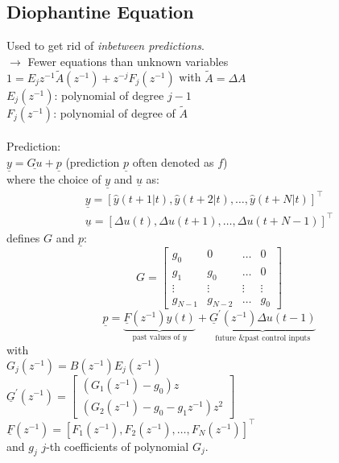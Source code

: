 \documentclass[english]{latex4ei/latex4ei_sheet}
\begin{document}
\begin{sectionbox}
\subsection{Diophantine Equation}
Used to get rid of \textit{inbetween predictions}.\\
$\rightarrow$ Fewer equations than unknown variables\\
$1=E_{j} z^{-1} \tilde{A}\left(z^{-1}\right)+z^{-j} F_{j}\left(z^{-1}\right)$ with $\tilde{A}=\Delta A$ \\ $E_{j}\left(z^{-1}\right)$: polynomial of degree $j-1$ \\ $F_{j}\left(z^{-1}\right)$: polynomial of degree of $\tilde{A}$
\\ \\

Prediction:\\ $\underline{y}=\underline{G u}+\underline{p}$ \quad(prediction $\underline{p}$ often denoted as $f$)\\
where the choice of $\underline{y}$ and $\underline{u}$ as:
$$
\begin{array}{l}{\underline{y}=[\hat{y}(t+1 | t), \hat{y}(t+2 | t), \ldots, \hat{y}(t+N | t)]^{\top}} \\ 
\underline{u}=[\Delta u(t), \Delta u(t+1), \ldots, \Delta u(t+N-1)]^{\top}
\end{array}
$$
defines $G$ and $\underline{p}$:
$$G=\left[\begin{array}{cccc}{g_{0}} & {0} & {\dots} & {0} \\ {g_{1}} & {g_{0}} & {\dots} & {0} \\ {\vdots} & {\vdots} & {\vdots} & {\vdots} \\ {g_{N-1}} & {g_{N-2}} & {\dots} & {g_{0}}\end{array}\right]$$
$$\underline{p}=\underbrace{\underline{F}\left(z^{-1}\right) y(t)}_{\text{past values of } y}+\underbrace{\underline{G}^{\prime}\left(z^{-1}\right) \Delta u(t-1)}_{\text{future \& past control inputs}}$$
with\\
$G_{j}\left(z^{-1}\right)=B\left(z^{-1}\right) E_{j}\left(z^{-1}\right)$\\
$\underline{G}^{\prime}\left(z^{-1}\right)=\left[\begin{array}{c}{\left(G_{1}\left(z^{-1}\right)-g_{0}\right) z} \\ {\left(G_{2}\left(z^{-1}\right)-g_{0}-g_{1} z^{-1}\right) z^{2}}\end{array}\right]$\\
$\underline{F}\left(z^{-1}\right)=\left[F_{1}\left(z^{-1}\right), F_{2}\left(z^{-1}\right), \ldots, F_{N}\left(z^{-1}\right)\right]^{\top}$\\
and $g_{j}$ $j$-th coefficients of polynomial $G_{j}$.

\end{sectionbox}
\end{document}
